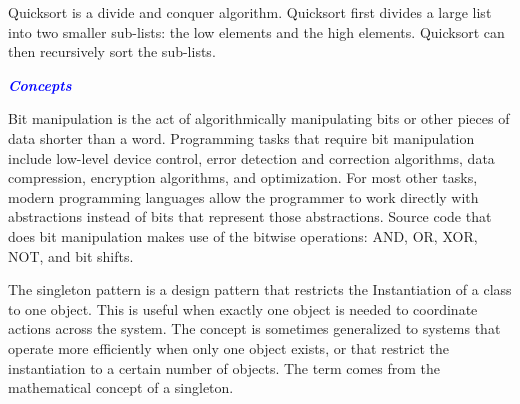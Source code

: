 \documentclass[9pt]{amsart}
\newcommand{\filldots}{\noindent \textbf {\textcolor {blue} {\dotfill}} }
\begin{document}
\begin{multicols}{2}
\begin{lstlisting}
\end{lstlisting}

\filldots 

\noindent {\textcolor {blue} {\em QuickSort}} 

\noindent Quicksort is a divide and conquer algorithm. Quicksort first divides a large list into two smaller sub-lists: the low elements and the high elements. Quicksort can then recursively sort the sub-lists.

\filldots 

\noindent {\textcolor {blue} {\em Breadth First Search}} 

\filldots 

\noindent {\textcolor {blue} {\em Depth First Search}} 

\filldots 


\filldots 

\noindent {\textcolor {blue} {\em Binary Search}} 

\filldots 

\noindent {\textcolor {blue} {\em Tree Insert / Find / etc... }} 

\filldots 

\noindent {\textcolor {blue} {\em $O(n * log(n))$ sorting Algorithms}} 

\filldots 

\noindent \textbf {\textcolor {blue} {\em Concepts}} 

\filldots 

\noindent {\textcolor {blue} {\em Bit Manipulation}} 

\noindent Bit manipulation is the act of algorithmically manipulating bits or other pieces of data shorter than a word. Programming tasks that require bit manipulation include low-level device control, error detection and correction algorithms, data compression, encryption algorithms, and optimization. For most other tasks, modern programming languages allow the programmer to work directly with abstractions instead of bits that represent those abstractions. Source code that does bit manipulation makes use of the bitwise operations: AND, OR, XOR, NOT, and bit shifts.

\noindent {\textcolor {blue} {\em Singleton Design Pattern}} 

\noindent The singleton pattern is a design pattern that restricts the Instantiation of a class to one object. This is useful when exactly one object is needed to coordinate actions across the system. The concept is sometimes generalized to systems that operate more efficiently when only one object exists, or that restrict the instantiation to a certain number of objects. The term comes from the mathematical concept of a singleton.


\end{multicols}
\end{document}
